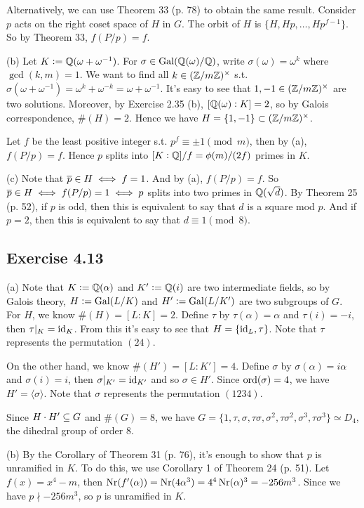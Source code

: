 \documentclass[../Marcus.tex]{subfiles}
\begin{document}
Alternatively, we can use Theorem 33 (p. 78) to obtain the same result. Consider $p$ acts on the right coset space of $H$ in $G$. The orbit of $H$ is $\{H,Hp,\ldots,Hp^{f-1}\}$. So by Theorem 33, $f(P/p)=f$.

(b) Let $K:=\mathbb{Q}(\omega+\omega^{-1})$. For $\sigma\in\operatorname{Gal}(\mathbb{Q}(\omega)/\mathbb{Q})$, write $\sigma(\omega)=\omega^k$ where $\gcd(k,m)=1$. We want to find all $k\in(\mathbb{Z}/m\mathbb{Z})^\times$ s.t. $\sigma(\omega+\omega^{-1})=\omega^k+\omega^{-k}=\omega+\omega^{-1}$. It's easy to see that $1,-1\in(\mathbb{Z}/m\mathbb{Z})^\times$ are two solutions. Moreover, by Exercise 2.35 (b), $[\mathbb{Q}(\omega):K]=2$, so by Galois correspondence, $\#(H)=2$. Hence we have $H=\{1,-1\}\subset(\mathbb{Z}/m\mathbb{Z})^\times$.

Let $f$ be the least positive integer s.t. $p^f \equiv \pm1\pmod{m}$, then by (a), $f(P/p)=f$. Hence $p$ splits into $[K:\mathbb{Q}] / f = \phi(m)/(2f)$ primes in $K$.

(c) Note that $\overline{p}\in H \iff f = 1$. And by (a), $f(P/p)=f$. So $\overline{p}\in H \iff f(P/p) = 1 \iff p$ splits into two primes in $\mathbb{Q}(\sqrt{d})$. By Theorem 25 (p. 52), if $p$ is odd, then this is equivalent to say that $d$ is a square mod $p$. And if $p=2$, then this is equivalent to say that $d\equiv 1\pmod{8}$.

\subsection*{Exercise 4.13}

(a) Note that $K:=\mathbb{Q}(\alpha)$ and $K':=\mathbb{Q}(i)$ are two intermediate fields, so by Galois theory, $H:=\operatorname{Gal}(L/K)$ and $H':=\operatorname{Gal}(L/K')$ are two subgroups of $G$.
For $H$, we know $\#(H)=[L:K]=2$. Define $\tau$ by $\tau(\alpha)=\alpha$ and $\tau(i)=-i$, then $\tau|_K=\operatorname{id}_K$. From this it's easy to see that $H=\{\operatorname{id}_L,\tau\}$. Note that $\tau$ represents the permutation $(24)$.

On the other hand, we know $\#(H')=[L:K']=4$. Define $\sigma$ by $\sigma(\alpha)=i\alpha$ and $\sigma(i)=i$, then $\sigma|_{K'}=\operatorname{id}_{K'}$ and so $\sigma\in H'$. Since $\operatorname{ord}(\sigma)=4$, we have $H'=\langle\sigma\rangle$. Note that $\sigma$ represents the permutation $(1234)$.

Since $H\cdot H'\subseteq G$ and $\#(G)=8$, we have $G=\{1,\tau,\sigma,\tau\sigma,\sigma^2,\tau\sigma^2,\sigma^3,\tau\sigma^3\}\simeq D_4$, the dihedral group of order $8$.

(b) By the Corollary of Theorem 31 (p. 76), it's enough to show that $p$ is unramified in $K$. To do this, we use Corollary 1 of Theorem 24 (p. 51). Let $f(x)=x^4-m$, then $\operatorname{Nr}(f'(\alpha))=\operatorname{Nr}(4\alpha^3)=4^4\operatorname{Nr}(\alpha)^3=-256m^3$. Since we have $p\nmid -256m^3$, so $p$ is unramified in $K$. 
\end{document}
